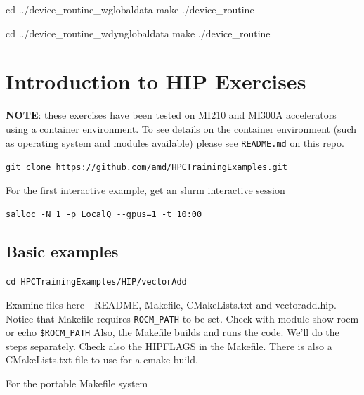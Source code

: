 \documentclass[
]{article}
\let\oldtexttt\texttt
\renewcommand{\texttt}[1]{
  \colorbox{Light}{\oldtexttt{#1}}
}
\newenvironment{Shaded}{}{}
\newcommand{\BuiltInTok}[1]{#1}
\newcommand{\ExtensionTok}[1]{#1}
\newcommand{\FunctionTok}[1]{\textcolor[rgb]{0.02,0.16,0.49}{#1}}
\newcommand{\NormalTok}[1]{#1}
\begin{document}
\begin{Shaded}
\begin{Highlighting}[]
\BuiltInTok{cd}\NormalTok{ ../device\_routine\_wglobaldata}
\FunctionTok{make}
\ExtensionTok{./device\_routine}
\end{Highlighting}
\end{Shaded}

\begin{Shaded}
\begin{Highlighting}[]
\BuiltInTok{cd}\NormalTok{ ../device\_routine\_wdynglobaldata}
\FunctionTok{make}
\ExtensionTok{./device\_routine}
\end{Highlighting}
\end{Shaded}

\pagebreak

\hypertarget{introduction-to-hip-exercises}{%
\section{Introduction to HIP
Exercises}\label{introduction-to-hip-exercises}}

\textbf{NOTE}: these exercises have been tested on MI210 and MI300A
accelerators using a container environment. To see details on the
container environment (such as operating system and modules available)
please see \texttt{README.md} on
\href{https://github.com/amd/HPCTrainingDock}{this} repo.

\texttt{git\ clone\ https://github.com/amd/HPCTrainingExamples.git}

For the first interactive example, get an slurm interactive session

\texttt{salloc\ -N\ 1\ -p\ LocalQ\ -\/-gpus=1\ -t\ 10:00}

\hypertarget{basic-examples}{%
\subsection{Basic examples}\label{basic-examples}}

\texttt{cd\ HPCTrainingExamples/HIP/vectorAdd}

Examine files here - README, Makefile, CMakeLists.txt and vectoradd.hip.
Notice that Makefile requires \texttt{ROCM\_PATH} to be set. Check with
module show rocm or echo \texttt{\$ROCM\_PATH} Also, the Makefile builds
and runs the code. We'll do the steps separately. Check also the
HIPFLAGS in the Makefile. There is also a CMakeLists.txt file to use for
a cmake build.

For the portable Makefile system
\end{document}
